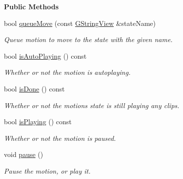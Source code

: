 \begin{Indent}\textbf{ Public Methods}\par
\begin{DoxyCompactItemize}
\item 
bool \mbox{\hyperlink{classrev_1_1_motion_acae849c523058ac301f3964c132e7629}{queue\+Move}} (const \mbox{\hyperlink{classrev_1_1_g_string_view}{G\+String\+View}} \&state\+Name)
\begin{DoxyCompactList}\small\item\em Queue motion to move to the state with the given name. \end{DoxyCompactList}\item 
\mbox{\label{classrev_1_1_motion_aa16b4701cde3207b62ac0a703d7bddf3}} 
bool \mbox{\hyperlink{classrev_1_1_motion_aa16b4701cde3207b62ac0a703d7bddf3}{is\+Auto\+Playing}} () const
\begin{DoxyCompactList}\small\item\em Whether or not the motion is autoplaying. \end{DoxyCompactList}\item 
\mbox{\label{classrev_1_1_motion_aeca0bcc0b2aaf0e869b4ac66631da5e6}} 
bool \mbox{\hyperlink{classrev_1_1_motion_aeca0bcc0b2aaf0e869b4ac66631da5e6}{is\+Done}} () const
\begin{DoxyCompactList}\small\item\em Whether or not the motion\textquotesingle{}s state is still playing any clips. \end{DoxyCompactList}\item 
\mbox{\label{classrev_1_1_motion_a37d1e01c9f039638b6f5ce7df3bad067}} 
bool \mbox{\hyperlink{classrev_1_1_motion_a37d1e01c9f039638b6f5ce7df3bad067}{is\+Playing}} () const
\begin{DoxyCompactList}\small\item\em Whether or not the motion is paused. \end{DoxyCompactList}\item 
\mbox{\label{classrev_1_1_motion_a5e0405408c3f202936443aace0b5dcbd}} 
void \mbox{\hyperlink{classrev_1_1_motion_a5e0405408c3f202936443aace0b5dcbd}{pause}} ()
\begin{DoxyCompactList}\small\item\em Pause the motion, or play it. \end{DoxyCompactList}\item 

\end{DoxyCompactItemize}
\end{Indent}
